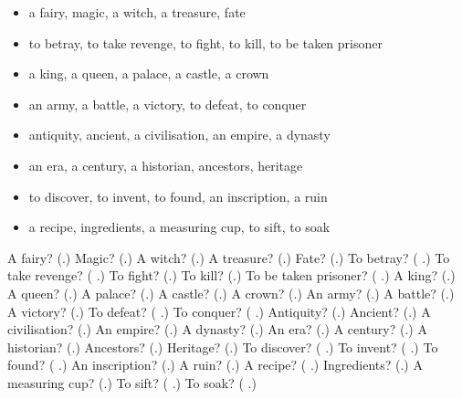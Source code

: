 \begin{itemize}
\raggedright
  \item a fairy, magic, a witch, a treasure, fate
  \item to betray, to take revenge, to fight, to kill, to be taken prisoner
  \item a king, a queen, a palace, a castle, a crown
  \item an army, a battle, a victory, to defeat, to conquer
  \item antiquity, ancient, a civilisation, an empire, a dynasty
  \item an era, a century, a historian, ancestors, heritage
  \item to discover, to invent, to found, an inscription, a ruin
  \item a recipe, ingredients, a measuring cup, to sift, to soak
\end{itemize}

\begin{tcolorbox}[breakable,colback=teal!4,colframe=teal!35!black,title={Before you move on}]
A fairy? (\textbf{}.) Magic? (\textbf{}.) A witch? (\textbf{}.) A treasure? (\textbf{}.) Fate? (\textbf{}.) To betray? (\textbf{ }.) To take revenge? (\textbf{ }.) To fight? (\textbf{}.) To kill? (\textbf{}.) To be taken prisoner? (\textbf{ }.) A king? (\textbf{}.) A queen? (\textbf{}.) A palace? (\textbf{}.) A castle? (\textbf{}.) A crown? (\textbf{}.) An army? (\textbf{}.) A battle? (\textbf{}.) A victory? (\textbf{}.) To defeat? (\textbf{ }.) To conquer? (\textbf{ }.) Antiquity? (\textbf{}.) Ancient? (\textbf{}.) A civilisation? (\textbf{}.) An empire? (\textbf{}.) A dynasty? (\textbf{}.) An era? (\textbf{}.) A century? (\textbf{}.) A historian? (\textbf{}.) Ancestors? (\textbf{}.) Heritage? (\textbf{}.) To discover? (\textbf{ }.) To invent? (\textbf{ }.) To found? (\textbf{ }.) An inscription? (\textbf{}.) A ruin? (\textbf{}.) A recipe? (\textbf{ }.) Ingredients? (\textbf{}.) A measuring cup? (\textbf{}.) To sift? (\textbf{ }.) To soak? (\textbf{ }.)
\end{tcolorbox}
